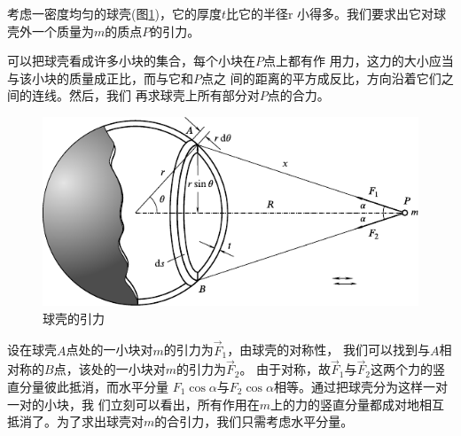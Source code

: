 考虑一密度均匀的球壳(图\ref{fig:04.10})，它的厚度$ t $比它的半径$ $r
小得多。我们要求出它对球壳外一个质量为$ m $的质点$ P $的引力。

可以把球壳看成许多小块的集合，每个小块在$ P $点上都有作
用力，这力的大小应当与该小块的质量成正比，而与它和$ P $点之
间的距离的平方成反比，方向沿着它们之间的连线。然后，我们
再求球壳上所有部分对$ P $点的合力。
\begin{figure}[h]
  \centering
  \includegraphics{figure/fig04.10}
  \caption{球壳的引力}
  \label{fig:04.10}
\end{figure}

设在球壳$ A $点处的一小块对$ m $的引力为$ \vec{F} _ { 1 } $，由球壳的对称性，
我们可以找到与$ A $相对称的$ B $点，该处的一小块对$ m $的引力为$ \vec{F} _ { 2 } $。
由于对称，故$ \vec{F} _ { 1 } $与$ \vec{F} _ { 2 } $这两个力的竖直分量彼此抵消，而水平分量
$ F _ { 1 } \cos \alpha $与$ F _ { 2 } \cos \alpha $相等。通过把球壳分为这样一对一对的小块，我
们立刻可以看出，所有作用在$ m $上的力的竖直分量都成对地相互
抵消了。为了求出球壳对$ m $的合引力，我们只需考虑水平分量。

